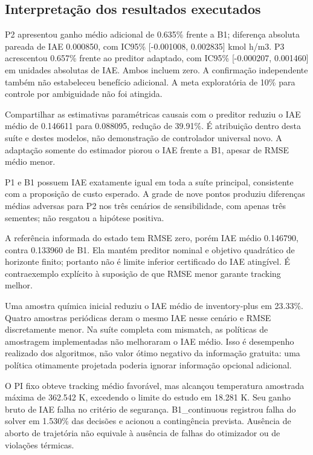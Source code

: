 \documentclass[
  11pt,
]{article}
\begin{document}
\endgroup

\hypertarget{interpretauxe7uxe3o-dos-resultados-executados}{%
\subsection{Interpretação dos resultados
executados}\label{interpretauxe7uxe3o-dos-resultados-executados}}

P2 apresentou ganho médio adicional de 0.635\% frente a B1; diferença
absoluta pareada de IAE 0.000850, com IC95\% {[}-0.001008, 0.002835{]}
kmol h/m3. P3 acrescentou 0.657\% frente ao preditor adaptado, com
IC95\% {[}-0.000207, 0.001460{]} em unidades absolutas de IAE. Ambos
incluem zero. A confirmação independente também não estabeleceu
benefício adicional. A meta exploratória de 10\% para controle por
ambiguidade não foi atingida.

Compartilhar as estimativas paramétricas causais com o preditor reduziu
o IAE médio de 0.146611 para 0.088095, redução de 39.91\%. É atribuição
dentro desta suíte e destes modelos, não demonstração de controlador
universal novo. A adaptação somente do estimador piorou o IAE frente a
B1, apesar de RMSE médio menor.

P1 e B1 possuem IAE exatamente igual em toda a suíte principal,
consistente com a proposição de custo esperado. A grade de nove pontos
produziu diferenças médias adversas para P2 nos três cenários de
sensibilidade, com apenas três sementes; não resgatou a hipótese
positiva.

A referência informada do estado tem RMSE zero, porém IAE médio
0.146790, contra 0.133960 de B1. Ela mantém preditor nominal e objetivo
quadrático de horizonte finito; portanto não é limite inferior
certificado do IAE atingível. É contraexemplo explícito à suposição de
que RMSE menor garante tracking melhor.

Uma amostra química inicial reduziu o IAE médio de inventory-plus em
23.33\%. Quatro amostras periódicas deram o mesmo IAE nesse cenário e
RMSE discretamente menor. Na suíte completa com mismatch, as políticas
de amostragem implementadas não melhoraram o IAE médio. Isso é
desempenho realizado dos algoritmos, não valor ótimo negativo da
informação gratuita: uma política otimamente projetada poderia ignorar
informação opcional adicional.

O PI fixo obteve tracking médio favorável, mas alcançou temperatura
amostrada máxima de 362.542 K, excedendo o limite do estudo em 18.281 K.
Seu ganho bruto de IAE falha no critério de segurança. B1\_continuous
registrou falha do solver em 1.530\% das decisões e acionou a
contingência prevista. Ausência de aborto de trajetória não equivale à
ausência de falhas do otimizador ou de violações térmicas.
\end{document}
